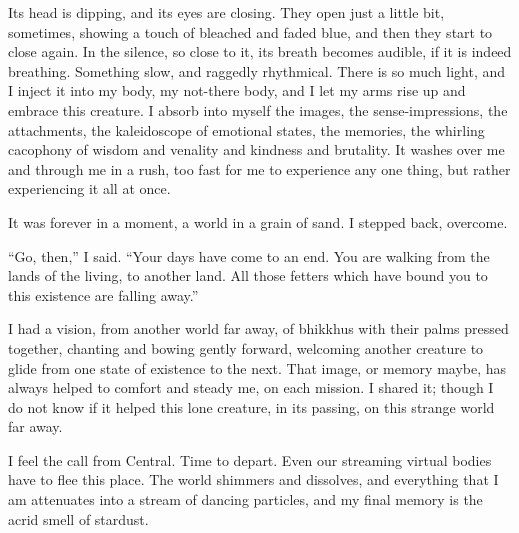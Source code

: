 Its head is dipping, and its eyes are closing. They open just a little
bit, sometimes, showing a touch of bleached and faded blue, and then
they start to close again. In the silence, so close to it, its breath
becomes audible, if it is indeed breathing. Something slow, and raggedly
rhythmical. There is so much light, and I inject it into my body, my
not-there body, and I let my arms rise up and embrace this creature. I
absorb into myself the images, the sense-impressions, the attachments,
the kaleidoscope of emotional states, the memories, the whirling
cacophony of wisdom and venality and kindness and brutality. It washes
over me and through me in a rush, too fast for me to experience any one
thing, but rather experiencing it all at once.

It was forever in a moment, a world in a grain of sand. I stepped back,
overcome.

``Go, then,'' I said. ``Your days have come to an end. You are walking
from the lands of the living, to another land. All those fetters which
have bound you to this existence are falling away.''

I had a vision, from another world far away, of bhikkhus with their
palms pressed together, chanting and bowing gently forward, welcoming
another creature to glide from one state of existence to the next. That
image, or memory maybe, has always helped to comfort and steady me, on
each mission. I shared it; though I do not know if it helped this lone
creature, in its passing, on this strange world far away.

I feel the call from Central. Time to depart. Even our streaming virtual
bodies have to flee this place. The world shimmers and dissolves, and
everything that I am attenuates into a stream of dancing particles, and
my final memory is the acrid smell of stardust.
